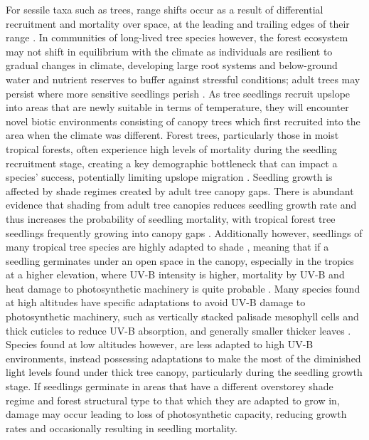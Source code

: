 \documentclass[a4paper, 11pt]{article}
\begin{document}
For sessile taxa such as trees, range shifts occur as a result of differential recruitment and mortality over space, at the leading and trailing edges of their range \citep{Corlett2013}. In communities of long-lived tree species however, the forest ecosystem may not shift in equilibrium with the climate as individuals are resilient to gradual changes in climate, developing large root systems and below-ground water and nutrient reserves to buffer against stressful conditions; adult trees may persist where more sensitive seedlings perish \citep{Bell2014, Lenoir2009}. As tree seedlings recruit upslope into areas that are newly suitable in terms of temperature, they will encounter novel biotic environments consisting of canopy trees which first recruited into the area when the climate was different. Forest trees, particularly those in moist tropical forests, often experience high levels of mortality during the seedling recruitment stage, creating a key demographic bottleneck that can impact a species' success, potentially limiting upslope migration \citep{Coomes2000}. Seedling growth is affected by shade regimes created by adult tree canopy gaps. There is abundant evidence that shading from adult tree canopies reduces seedling growth rate and thus increases the probability of seedling mortality, with tropical forest tree seedlings frequently growing into canopy gaps \citep{Valladares2016}. Additionally however, seedlings of many tropical tree species are highly adapted to shade \citep{Matsubara2009}, meaning that if a seedling germinates under an open space in the canopy, especially in the tropics at a higher elevation, where UV-B intensity is higher, mortality by UV-B and heat damage to photosynthetic machinery is quite probable \citep{Krause2001, Li2010}. Many species found at high altitudes have specific adaptations to avoid UV-B damage to photosynthetic machinery, such as vertically stacked palisade mesophyll cells and thick cuticles to reduce UV-B absorption, and generally smaller thicker leaves \citep{Prado2012}. Species found at low altitudes however, are less adapted to high UV-B environments, instead possessing adaptations to make the most of the diminished light levels found under thick tree canopy, particularly during the seedling growth stage. If seedlings germinate in areas that have a different overstorey shade regime and forest structural type to that which they are adapted to grow in, damage may occur leading to loss of photosynthetic capacity, reducing growth rates and occasionally resulting in seedling mortality. 
\end{document}
